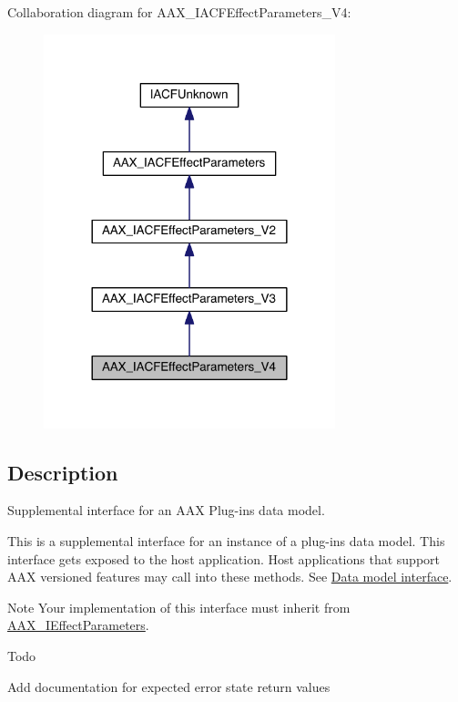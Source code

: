 Collaboration diagram for A\+A\+X\+\_\+\+I\+A\+C\+F\+Effect\+Parameters\+\_\+\+V4\+:
\nopagebreak
\begin{figure}[H]
\begin{center}
\leavevmode
\includegraphics[width=240pt]{a00536}
\end{center}
\end{figure}


\subsection{Description}
Supplemental interface for an A\+A\+X Plug-\/in\textquotesingle{}s data model. 

This is a supplemental interface for an instance of a plug-\/in\textquotesingle{}s data model. This interface gets exposed to the host application. Host applications that support A\+A\+X versioned features may call into these methods. See \hyperlink{a00328}{Data model interface}.

\begin{DoxyNote}{Note}
Your implementation of this interface must inherit from \hyperlink{a00099}{A\+A\+X\+\_\+\+I\+Effect\+Parameters}.
\end{DoxyNote}
\begin{DoxyRefDesc}{Todo}
\item[\hyperlink{a00382__todo000034}{Todo}]Add documentation for expected error state return values\end{DoxyRefDesc}
